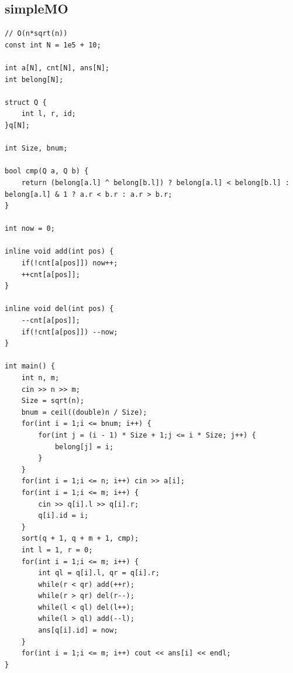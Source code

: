 \documentclass[twoside]{article}
\begin{document}
\subsection{simpleMO}
\begin{lstlisting}
// O(n*sqrt(n))
const int N = 1e5 + 10;

int a[N], cnt[N], ans[N];
int belong[N];

struct Q {
    int l, r, id;
}q[N];

int Size, bnum;

bool cmp(Q a, Q b) {
    return (belong[a.l] ^ belong[b.l]) ? belong[a.l] < belong[b.l] : belong[a.l] & 1 ? a.r < b.r : a.r > b.r; 
}

int now = 0;

inline void add(int pos) {
    if(!cnt[a[pos]]) now++;
    ++cnt[a[pos]];
}

inline void del(int pos) {
    --cnt[a[pos]];
    if(!cnt[a[pos]]) --now;
}

int main() {
    int n, m;
    cin >> n >> m;
    Size = sqrt(n);
    bnum = ceil((double)n / Size);
    for(int i = 1;i <= bnum; i++) {
        for(int j = (i - 1) * Size + 1;j <= i * Size; j++) {
            belong[j] = i;
        }
    }
    for(int i = 1;i <= n; i++) cin >> a[i];
    for(int i = 1;i <= m; i++) {
        cin >> q[i].l >> q[i].r;
        q[i].id = i;
    }
    sort(q + 1, q + m + 1, cmp);
    int l = 1, r = 0;
    for(int i = 1;i <= m; i++) {
        int ql = q[i].l, qr = q[i].r;
        while(r < qr) add(++r);
        while(r > qr) del(r--);
        while(l < ql) del(l++);
        while(l > ql) add(--l);
        ans[q[i].id] = now;
    }
    for(int i = 1;i <= m; i++) cout << ans[i] << endl;  
}\end{lstlisting}
\end{document}
